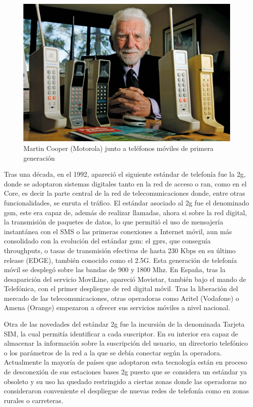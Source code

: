 \begin{figure}[h]
    \centering
        \includegraphics[width=15cm]{archivos/motorola}
        \caption{Martin Cooper (Motorola) junto a teléfonos móviles de primera generación}
        \label{fig:motorola}
\end{figure}

\par Tras una década, en el 1992, apareció el siguiente estándar de telefonía fue la \gls{2g}, donde se adoptaron sistemas digitales tanto en la red de acceso o \gls{ran}, como en el Core, es decir la parte central de la red de telecomunicaciones donde, entre otras funcionalidades, se enruta el tráfico.
El estándar asociado al \gls{2g} fue el denominado \gls{gsm}, este era capaz de, además de realizar llamadas, ahora si sobre la red digital, la transmisión de paquetes de datos, lo que permitió el uso de mensajería instantánea con el SMS o las primeras conexiones a Internet móvil, aun más consolidado con la evolución del estándar \gls{gsm}: el \gls{gprs}, que conseguía throughputs, o tasas de transmisión efectivas de hasta 230 Kbps en su último release (EDGE), también conocido como el 2.5G. Esta generación de telefonía móvil se desplegó sobre las bandas de 900 y 1800 Mhz. En España, tras la desaparición del servicio MoviLine, apareció Movistar, también bajo el mando de Telefónica, con el primer despliegue de red digital móvil. Tras la liberación del mercado de las telecomunicaciones, otras operadoras como Aritel (Vodafone) o Amena (Orange) empezaron a ofrecer sus servicios móviles a nivel nacional. 
\\
\par Otra de las novedades del estándar \gls{2g} fue la incursión de la denominada Tarjeta SIM, la cual permitía identificar a cada suscriptor. En su interior era capaz de almacenar la información sobre la suscripción del usuario, un directorio telefónico o los parámetros de la red a la que se debía conectar según la operadora. Actualmente la mayoría de países que adoptaron esta tecnología están en proceso de desconexión de sus estaciones bases \gls{2g} puesto que se considera un estándar ya obsoleto y su uso ha quedado restringido a ciertas zonas donde las operadoras no consideraron conveniente el despliegue de nuevas redes de telefonía como en zonas rurales o carreteras.
